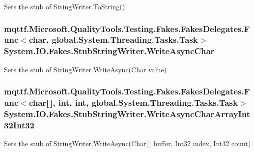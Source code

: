 Sets the stub of String\-Writer.\-To\-String()

\hypertarget{class_system_1_1_i_o_1_1_fakes_1_1_stub_string_writer_a45a5a41b19edd396a8df7b4050c7e969}{
\subsubsection[{Write\-Async\-Char}]{\setlength{\rightskip}{0pt plus 5cm}mqttf.\-Microsoft.\-Quality\-Tools.\-Testing.\-Fakes.\-Fakes\-Delegates.\-Func$<$char, global.\-System.\-Threading.\-Tasks.\-Task$>$ System.\-I\-O.\-Fakes.\-Stub\-String\-Writer.\-Write\-Async\-Char}}\label{class_system_1_1_i_o_1_1_fakes_1_1_stub_string_writer_a45a5a41b19edd396a8df7b4050c7e969}


Sets the stub of String\-Writer.\-Write\-Async(\-Char value)

\hypertarget{class_system_1_1_i_o_1_1_fakes_1_1_stub_string_writer_af816cc646aaf15afdd55b7dc81c72127}{
\subsubsection[{Write\-Async\-Char\-Array\-Int32\-Int32}]{\setlength{\rightskip}{0pt plus 5cm}mqttf.\-Microsoft.\-Quality\-Tools.\-Testing.\-Fakes.\-Fakes\-Delegates.\-Func$<$char\mbox{[}$\,$\mbox{]}, int, int, global.\-System.\-Threading.\-Tasks.\-Task$>$ System.\-I\-O.\-Fakes.\-Stub\-String\-Writer.\-Write\-Async\-Char\-Array\-Int32\-Int32}}\label{class_system_1_1_i_o_1_1_fakes_1_1_stub_string_writer_af816cc646aaf15afdd55b7dc81c72127}


Sets the stub of String\-Writer.\-Write\-Async(\-Char\mbox{[}$\,$\mbox{]} buffer, Int32 index, Int32 count)

